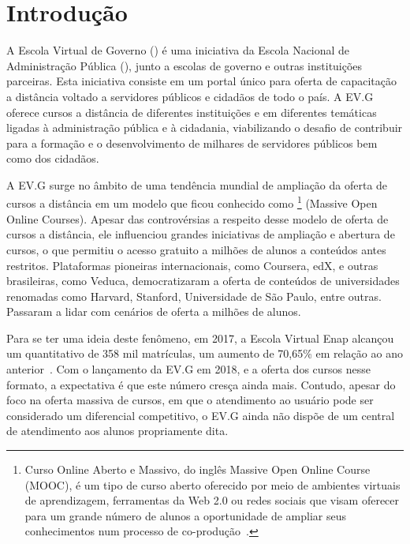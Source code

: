 \chapter{Introdução}\label{cap:01:introducao}

A Escola Virtual de Governo () é uma iniciativa da Escola Nacional de Administração Pública (), junto a escolas de governo e outras instituições parceiras.
Esta iniciativa consiste em um portal único para oferta de capacitação a distância voltado a servidores públicos e cidadãos de todo o país.
A EV.G oferece cursos a distância de diferentes instituições e em diferentes temáticas ligadas à administração pública e à cidadania, viabilizando o desafio de contribuir para a formação e o desenvolvimento de milhares de servidores públicos bem como dos cidadãos.

A EV.G surge no âmbito de uma tendência mundial de ampliação da oferta de cursos a distância em um modelo que ficou conhecido como \footnote{Curso Online Aberto e Massivo, do inglês Massive Open Online Course (MOOC), é um tipo de curso aberto oferecido por meio de ambientes virtuais de aprendizagem, ferramentas da Web 2.0 ou redes sociais que visam oferecer para um grande número de alunos a oportunidade de ampliar seus conhecimentos num processo de co-produção~\cite{Mooc}.} (Massive Open Online Courses). Apesar das controvérsias a respeito desse modelo de oferta de cursos a distância, ele influenciou grandes iniciativas de ampliação e abertura de cursos, o que permitiu o acesso gratuito a milhões de alunos a conteúdos antes restritos. Plataformas pioneiras internacionais, como Coursera, edX, e outras brasileiras, como Veduca, democratizaram a oferta de conteúdos de universidades renomadas como Harvard, Stanford, Universidade de São Paulo, entre outras. Passaram a lidar com cenários de oferta a milhões de alunos. 

Para se ter uma ideia deste fenômeno, em 2017, a Escola Virtual Enap alcançou um quantitativo de 358 mil matrículas, um aumento de 70,65\% em relação ao ano anterior~\cite{EVGnumeros}.
Com o lançamento da EV.G em 2018, e a oferta dos cursos nesse formato, a expectativa é que este número cresça ainda mais.
Contudo, apesar do foco na oferta massiva de cursos, em que o atendimento ao usuário pode ser considerado um diferencial competitivo, o EV.G ainda não dispõe de um central de atendimento aos alunos propriamente dita.

